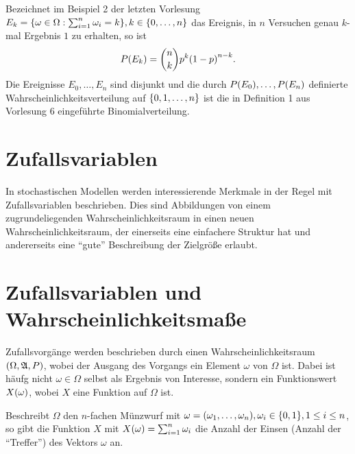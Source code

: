 \documentclass{lecture}
\begin{document}
    \begin{example}
        Bezeichnet im Beispiel 2 der letzten Vorlesung \(E_k = \braces*{\omega \in \Omega : \sum_{i = 1}^n \omega_i = k}, k \in \braces*{0, \ldots, n}\) das Ereignis, in \(n\) Versuchen genau \(k\)-mal Ergebnis \(1\) zu erhalten, so ist
        \[
            P\parentheses*{E_k} = \binom{n}{k}p^k\parentheses*{1 - p}^{n - k}.
        \]
        Die Ereignisse \(E_0, \ldots, E_n\) sind disjunkt und die durch \(P\parentheses*{E_0}, \ldots, P\parentheses*{E_n}\) definierte Wahrscheinlichkeitsverteilung auf \(\braces*{0, 1, \ldots, n}\) ist die in Definition 1 aus Vorlesung 6 eingeführte Binomialverteilung.
    \end{example}


    \section*{Zufallsvariablen}

    In stochastischen Modellen werden interessierende Merkmale in der Regel mit Zufallsvariablen beschrieben.
    Dies sind Abbildungen von einem zugrundeliegenden Wahrscheinlichkeitsraum in einen neuen Wahrscheinlichkeitsraum, der einerseits eine einfachere Struktur hat und andererseits eine ``gute'' Beschreibung der Zielgröße erlaubt.


    \section*{Zufallsvariablen und Wahrscheinlichkeitsmaße}

    Zufallsvorgänge werden beschrieben durch einen Wahrscheinlichkeitsraum \(\parentheses*{\Omega, \mathfrak{A}, P}\), wobei der Ausgang des Vorgangs ein Element \(\omega\) von \(\Omega\) ist.
    Dabei ist häufg nicht \(\omega \in \Omega\) selbst als Ergebnis von Interesse, sondern ein Funktionswert \(X\parentheses*{\omega}\), wobei \(X\) eine Funktion auf \(\Omega\) ist.

    \begin{example}
        Beschreibt \(\Omega\) den \(n\)-fachen Münzwurf mit \(\omega = \parentheses*{\omega_1, \ldots, \omega_n}, \omega_i \in \braces*{0, 1}, 1 \le i \le n\), so gibt die Funktion \(X\) mit \(X\parentheses*{\omega} = \sum_{i = 1}^n \omega_i\) die Anzahl der Einsen (Anzahl der ``Treffer'') des Vektors \(\omega\) an.
    \end{example}
\end{document}
